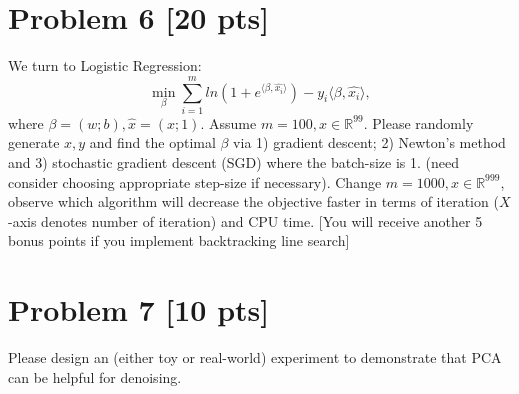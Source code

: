 \documentclass[11pt]{article}
\newcommand{\R}{\mathbb{R}}
\def \lg       {\langle}
\def \rg       {\rangle}
\def \R {\mathbb{R}}
\begin{document}
\newpage
\section*{Problem 6 [20 pts]}
We turn to Logistic Regression:
\begin{equation}
	\min_\beta \sum\limits_{i=1}^{m} ln(1+e^{\lg \beta, \hat{x_i}\rg})-y_{i}\lg \beta, \hat{x_i}\rg, 
\end{equation}
where $\beta=(w;b), \hat{x}=(x;1)$. Assume $m=100, x\in\R^{99}$. Please randomly generate $x, y$ and find the optimal $\beta$ via 1) gradient descent; 2) Newton's method and 3) stochastic gradient descent (SGD) where the batch-size is 1. (need consider choosing appropriate  step-size if necessary). Change $m=1000, x\in\R^{999}$, observe which algorithm will decrease the objective faster in terms of iteration ($X$-axis denotes number of iteration) and CPU time. [You will receive another 5 bonus points if you implement backtracking line search]

\newpage
\section*{Problem 7 [10 pts]}
Please design an (either toy or real-world) experiment  to demonstrate that PCA can be helpful for denoising.
\newpage
\end{document}
